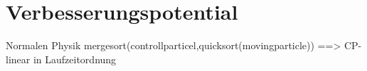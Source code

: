 \chapter{Verbesserungspotential}
Normalen
Physik
mergesort(controllparticel,quicksort(movingparticle)) ==> CP-linear in Laufzeitordnung